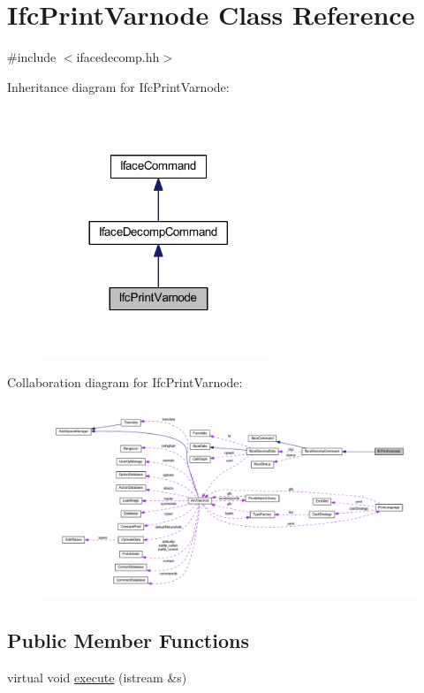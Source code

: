\hypertarget{class_ifc_print_varnode}{}\section{Ifc\+Print\+Varnode Class Reference}
\label{class_ifc_print_varnode}


{\ttfamily \#include $<$ifacedecomp.\+hh$>$}



Inheritance diagram for Ifc\+Print\+Varnode\+:
\nopagebreak
\begin{figure}[H]
\begin{center}
\leavevmode
\includegraphics[width=197pt]{class_ifc_print_varnode__inherit__graph}
\end{center}
\end{figure}


Collaboration diagram for Ifc\+Print\+Varnode\+:
\nopagebreak
\begin{figure}[H]
\begin{center}
\leavevmode
\includegraphics[width=350pt]{class_ifc_print_varnode__coll__graph}
\end{center}
\end{figure}
\subsection*{Public Member Functions}
\begin{DoxyCompactItemize}
\item 
virtual void \mbox{\hyperlink{class_ifc_print_varnode_a45fb7ac3722eb334d0c28b5ee6b16d0e}{execute}} (istream \&s)
\end{DoxyCompactItemize}
